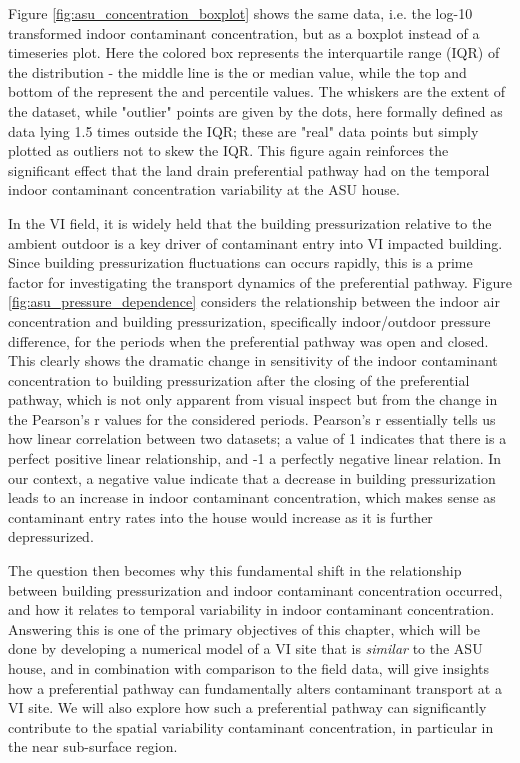 Figure \ref{fig:asu_concentration_boxplot} shows the same data, i.e. the log-10 transformed indoor contaminant concentration, but as a boxplot instead of a timeseries plot.
Here the colored box represents the interquartile range (IQR) of the distribution - the middle line is the  or median value, while the top and bottom of the represent the  and  percentile values.
The whiskers are the extent of the dataset, while "outlier" points are given by the dots, here formally defined as data lying 1.5 times outside the IQR; these are "real" data points but simply plotted as outliers not to skew the IQR.
This figure again reinforces the significant effect that the land drain preferential pathway had on the temporal indoor contaminant concentration variability at the ASU house.\par

In the VI field, it is widely held that the building pressurization relative to the ambient outdoor is a key driver of contaminant entry into VI impacted building.
Since building pressurization fluctuations can occurs rapidly, this is a prime factor for investigating the transport dynamics of the preferential pathway.
Figure \ref{fig:asu_pressure_dependence} considers the relationship between the indoor air concentration and building pressurization, specifically indoor/outdoor pressure difference, for the periods when the preferential pathway was open and closed.
This clearly shows the dramatic change in sensitivity of the indoor contaminant concentration to building pressurization after the closing of the preferential pathway, which is not only apparent from visual inspect but from the change in the Pearson's r values for the considered periods.
Pearson's r essentially tells us how linear correlation between two datasets; a value of 1 indicates that there is a perfect positive linear relationship, and -1 a perfectly negative linear relation.
In our context, a negative value indicate that a decrease in building pressurization leads to an increase in indoor contaminant concentration, which makes sense as contaminant entry rates into the house would increase as it is further depressurized.\par

The question then becomes why this fundamental shift in the relationship between building pressurization and indoor contaminant concentration occurred, and how it relates to temporal variability in indoor contaminant concentration.
Answering this is one of the primary objectives of this chapter, which will be done by developing a numerical model of a VI site that is \textit{similar} to the ASU house, and in combination with comparison to the field data, will give insights how a preferential pathway can fundamentally alters contaminant transport at a VI site.
We will also explore how such a preferential pathway can significantly contribute to the spatial variability contaminant concentration, in particular in the near sub-surface region.\par

